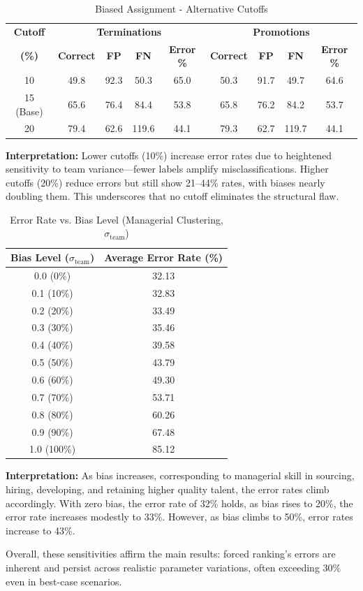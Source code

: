 \documentclass[12pt]{article}
\begin{document}
\begin{table}[h]
\centering
\caption{Biased Assignment - Alternative Cutoffs}
\label{tab:sens-cutoff-biased}
\small
\begin{tabular}{ccccccccc}
\toprule
\textbf{Cutoff} & \multicolumn{4}{c}{\textbf{Terminations}} & \multicolumn{4}{c}{\textbf{Promotions}} \\
\textbf{(\%)} & \textbf{Correct} & \textbf{FP} & \textbf{FN} & \textbf{Error \%} & \textbf{Correct} & \textbf{FP} & \textbf{FN} & \textbf{Error \%} \\
\midrule
10 & 49.8 & 92.3 & 50.3 & 65.0 & 50.3 & 91.7 & 49.7 & 64.6 \\
15 (Base) & 65.6 & 76.4 & 84.4 & 53.8 & 65.8 & 76.2 & 84.2 & 53.7 \\
20 & 79.4 & 62.6 & 119.6 & 44.1 & 79.3 & 62.7 & 119.7 & 44.1 \\
\bottomrule
\end{tabular}
\end{table}

\textbf{Interpretation:} Lower cutoffs (10\%) increase error rates due to heightened sensitivity to team variance---fewer labels amplify misclassifications. Higher cutoffs (20\%) reduce errors but still show 21--44\% rates, with biases nearly doubling them. This underscores that no cutoff eliminates the structural flaw.

\begin{table}[h]
\centering
\caption{Error Rate vs. Bias Level (Managerial Clustering, $\sigma_{\text{team}}$)}
\label{tab:sens-bias-curve}
\small
\begin{tabular}{cc}
\toprule
\textbf{Bias Level ($\sigma_{\text{team}}$)} & \textbf{Average Error Rate (\%)} \\
\midrule
0.0 (0\%)  & 32.13 \\
0.1 (10\%) & 32.83 \\
0.2 (20\%) & 33.49 \\
0.3 (30\%) & 35.46 \\
0.4 (40\%) & 39.58 \\
0.5 (50\%) & 43.79 \\
0.6 (60\%) & 49.30 \\
0.7 (70\%) & 53.71 \\
0.8 (80\%) & 60.26 \\
0.9 (90\%) & 67.48 \\
1.0 (100\%) & 85.12 \\
\bottomrule
\end{tabular}
\end{table}

\textbf{Interpretation:} As bias increases, corresponding to managerial skill in sourcing, hiring, developing, and retaining higher quality talent, the error rates climb accordingly. With zero bias, the error rate of 32\% holds, as bias rises to 20\%, the error rate increases modestly to 33\%.  However, as bias climbs to 50\%, error rates increase to 43\%.

Overall, these sensitivities affirm the main results: forced ranking's errors are inherent and persist across realistic parameter variations, often exceeding 30\% even in best-case scenarios.
\end{document}
